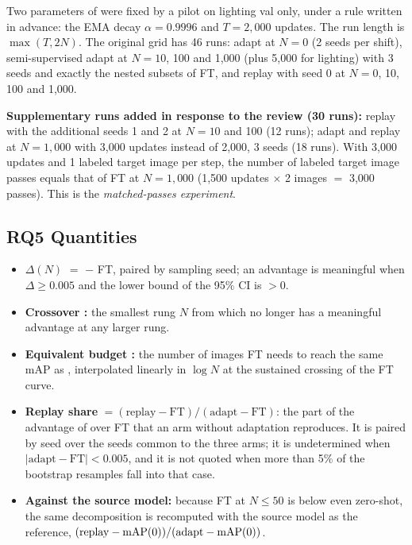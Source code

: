 Two parameters of \aldi were fixed by a pilot on lighting val only, under a rule written in advance: the EMA decay $\alpha = 0.9996$ and $T = 2{,}000$ updates. The run length is $\max(T, 2N)$. The original grid has 46 runs: adapt at $N = 0$ (2 seeds per shift), semi-supervised adapt at $N = 10$, 100 and 1,000 (plus 5,000 for lighting) with 3 seeds and exactly the nested subsets of FT, and replay with seed 0 at $N = 0$, 10, 100 and 1,000.

\textbf{Supplementary runs added in response to the review (30 runs):} replay with the additional seeds 1 and 2 at $N = 10$ and 100 (12 runs); adapt and replay at $N = 1{,}000$ with 3,000 updates instead of 2,000, 3 seeds (18 runs). With 3,000 updates and 1 labeled target image per step, the number of labeled target image passes equals that of FT at $N = 1{,}000$ (1,500 updates $\times$ 2 images $=$ 3,000 passes). This is the \emph{matched-passes experiment}.

\subsection{RQ5 Quantities}\label{sec:rq5quant}

\begin{itemize}
\item \textbf{\boldmath$\Delta(N)$} $=$ \aldi $-$ FT, paired by sampling seed; an advantage is meaningful when $\Delta \geq 0.005$ and the lower bound of the 95\% CI is $> 0$.
\item \textbf{Crossover \boldmath\Nx:} the smallest rung $N$ from which \aldi no longer has a meaningful advantage at any larger rung.
\item \textbf{Equivalent budget \boldmath\Neq:} the number of images FT needs to reach the same mAP as \aldi, interpolated linearly in $\log N$ at the sustained crossing of the FT curve.
\item \textbf{Replay share} $= (\text{replay} - \text{FT}) / (\text{adapt} - \text{FT})$: the part of the advantage of \aldi over FT that an arm without adaptation reproduces. It is paired by seed over the seeds common to the three arms; it is undetermined when $|\text{adapt} - \text{FT}| < 0.005$, and it is not quoted when more than 5\% of the bootstrap resamples fall into that case.
\item \textbf{Against the source model:} because FT at $N \leq 50$ is below even zero-shot, the same decomposition is recomputed with the source model as the reference, $(\text{replay} - \mathrm{mAP}(0)) / (\text{adapt} - \mathrm{mAP}(0))$.
\end{itemize}

